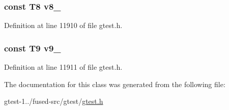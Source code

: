 \hypertarget{classtesting_1_1internal_1_1ValueArray32_a596bc5260b2474271d1f6910ff6f665d}{
\subsubsection[{v8\-\_\-}]{\setlength{\rightskip}{0pt plus 5cm}const \-T8 {\bf v8\-\_\-}}}\label{d1/d84/classtesting_1_1internal_1_1ValueArray32_a596bc5260b2474271d1f6910ff6f665d}


\-Definition at line 11910 of file gtest.\-h.

\hypertarget{classtesting_1_1internal_1_1ValueArray32_a6356e16cf54a9dfac8525f20242af31e}{
\subsubsection[{v9\-\_\-}]{\setlength{\rightskip}{0pt plus 5cm}const \-T9 {\bf v9\-\_\-}}}\label{d1/d84/classtesting_1_1internal_1_1ValueArray32_a6356e16cf54a9dfac8525f20242af31e}


\-Definition at line 11911 of file gtest.\-h.



\-The documentation for this class was generated from the following file\-:\begin{DoxyCompactItemize}
\item 
gtest-\/1../fused-\/src/gtest/\hyperlink{fused-src_2gtest_2gtest_8h}{gtest.\-h}\end{DoxyCompactItemize}
